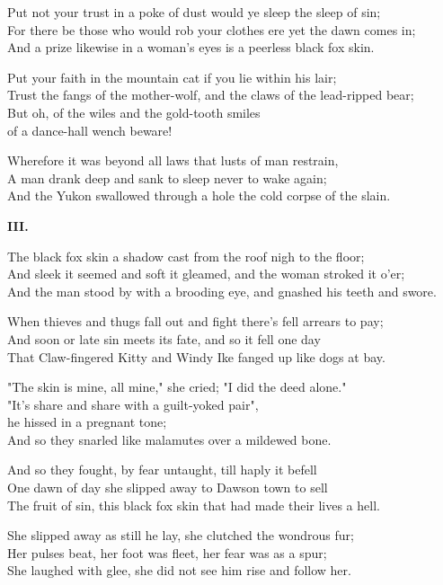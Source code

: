 \begin{poemblock}
Put not your trust in a poke of dust would ye sleep the sleep of sin;\\
For there be those who would rob your clothes ere yet the dawn comes in;\\
And a prize likewise in a woman's eyes is a peerless black fox skin.

Put your faith in the mountain cat if you lie within his lair;\\
Trust the fangs of the mother-wolf, and the claws of the lead-ripped bear;\\
But oh, of the wiles and the gold-tooth smiles\\
\idt of a dance-hall wench beware!

Wherefore it was beyond all laws that lusts of man restrain,\\
A man drank deep and sank to sleep never to wake again;\\
And the Yukon swallowed through a hole the cold corpse of the slain.

\textbf{III.}

The black fox skin a shadow cast from the roof nigh to the floor;\\
And sleek it seemed and soft it gleamed, and the woman stroked it o'er;\\
And the man stood by with a brooding eye, and gnashed his teeth and swore.

When thieves and thugs fall out and fight there's fell arrears to pay;\\
And soon or late sin meets its fate, and so it fell one day\\
That Claw-fingered Kitty and Windy Ike fanged up like dogs at bay.

"The skin is mine, all mine," she cried; "I did the deed alone."\\
"It's share and share with a guilt-yoked pair",\\
\idt he hissed in a pregnant tone;\\
And so they snarled like malamutes over a mildewed bone.

And so they fought, by fear untaught, till haply it befell\\
One dawn of day she slipped away to Dawson town to sell\\
The fruit of sin, this black fox skin that had made their lives a hell.

She slipped away as still he lay, she clutched the wondrous fur;\\
Her pulses beat, her foot was fleet, her fear was as a spur;\\
She laughed with glee, she did not see him rise and follow her.


\end{poemblock}
